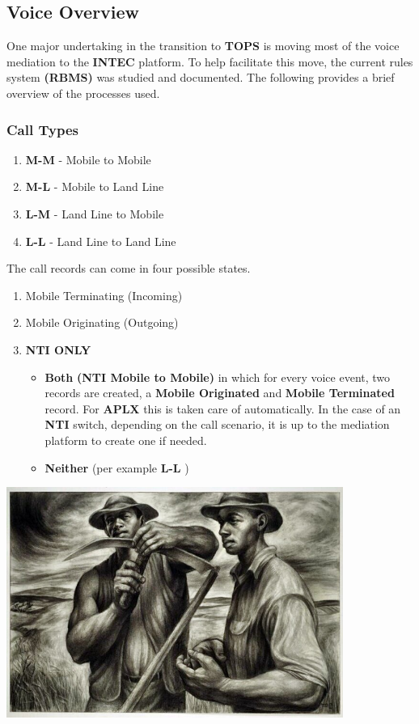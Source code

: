 \documentclass[12pt,twoside]{article}
\begin{document}
\subsection{Voice Overview}
\label{sec:orgheadline31}
One major undertaking in the transition to \textbf{TOPS} is moving most of the voice mediation to the \textbf{INTEC} platform. To help facilitate this move, the current rules system \textbf{(RBMS)} was studied and documented. The following provides a brief overview of the processes used.
\subsubsection{Call Types}
\label{sec:orgheadline28}
\begin{enumerate}
\item \textbf{M-M} - Mobile to Mobile
\item \textbf{M-L} - Mobile to Land Line
\item \textbf{L-M} - Land Line to Mobile
\item \textbf{L-L} - Land Line to Land Line
\end{enumerate}
The call records can come in four possible states.
\begin{enumerate}
\item Mobile Terminating (Incoming)
\item Mobile Originating (Outgoing)
\item \textbf{NTI ONLY}
\begin{itemize}
\item \textbf{Both}  \newline \textbf{(NTI Mobile to Mobile)} in which for every voice event, two records are created, a \textbf{Mobile Originated} and \textbf{Mobile Terminated} record. For \textbf{APLX} this is taken care of automatically. In the case of an \textbf{NTI} switch, depending on the call scenario, it is up to the mediation platform to create one if needed.
\item \textbf{Neither} \newline (per example \textbf{L-L} )
\end{itemize}
\end{enumerate}
\includegraphics[width=11cm]{Pictures/white-charles-harvest_talk.jpg}
\end{document}
